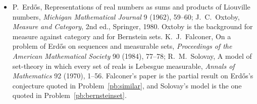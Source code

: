 \begin{itemize}
\item P.~Erdős, Representations of real numbers as sums and products of Liouville numbers, \emph{Michigan Mathematical Journal} 9 (1962), 59--60; J.~C.~Oxtoby, \emph{Measure
and Category}, 2nd ed., Springer, 1980. Oxtoby is the background for measure against category and for Bernstein sets.
K.~J.~Falconer, On a problem of Erdős on sequences and measurable sets, \emph{Proceedings of
the American Mathematical Society} 90 (1984), 77--78; R.~M.~Solovay, A model of set-theory in which every set of reals is Lebesgue measurable, \emph{Annals of Mathematics} 92
(1970), 1--56. Falconer's paper is the partial result on Erdős's conjecture quoted in Problem~\ref{pb:similar}, and Solovay's model is the one quoted in Problem~\ref{pb:bernsteinset}.
\end{itemize}
